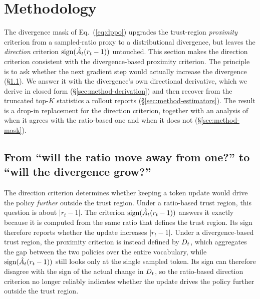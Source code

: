 \section{Methodology}
\label{sec:method}

The divergence mask of Eq.~(\ref{eq:dppo}) upgrades the trust-region
\emph{proximity} criterion from a sampled-ratio proxy to a distributional
divergence, but leaves the
\emph{direction} criterion $\operatorname{sign}(\hat{A}_t(r_t-1))$ untouched. This section makes the
direction criterion consistent with the divergence-based proximity criterion. The
principle is to ask whether the next gradient step would actually increase the
divergence (\S\ref{sec:method-principle}).
We answer it with the divergence's own directional derivative, which we derive in
closed form (\S\ref{sec:method-derivation})
and then recover from the truncated top-$K$ statistics a rollout reports
(\S\ref{sec:method-estimators}). The result is a drop-in replacement for the direction
criterion, together with an analysis of when it agrees with the ratio-based one and when
it does not (\S\ref{sec:method-mask}).

\subsection{From ``will the ratio move away from one?'' to ``will the divergence grow?''}
\label{sec:method-principle}

The direction criterion determines whether keeping a token update would drive
the policy \emph{further} outside the trust region.
Under a ratio-based trust region, this question is about $|r_t-1|$.
The criterion $\operatorname{sign}(\hat{A}_t(r_t-1))$ answers it exactly because it is computed from the same ratio that defines the trust region.
Its sign therefore reports whether the update increases $|r_t-1|$.
Under a divergence-based trust region, the proximity criterion is instead defined by $D_t$, which aggregates the gap between the two policies over the entire vocabulary, while $\operatorname{sign}(\hat{A}_t(r_t-1))$ still looks only at the single sampled token. 
Its sign can therefore disagree with the sign of the actual change in $D_t$, 
so the ratio-based direction criterion no longer reliably indicates whether the update drives the policy further outside the trust region.

